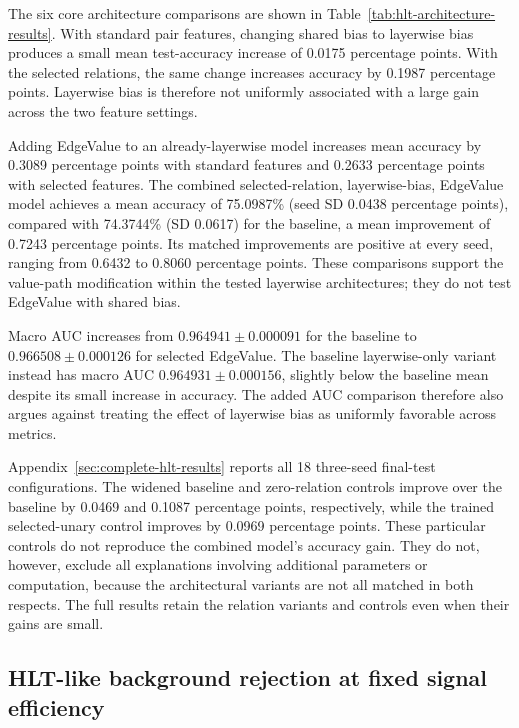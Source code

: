 The six core architecture comparisons are shown in
Table~\ref{tab:hlt-architecture-results}. With standard pair features,
changing shared bias to layerwise bias produces a small mean test-accuracy
increase of 0.0175 percentage points. With the selected relations, the same
change increases accuracy by 0.1987 percentage points. Layerwise bias is
therefore not uniformly associated with a large gain across the two feature
settings.



Adding EdgeValue to an already-layerwise model increases mean accuracy by
0.3089 percentage points with standard features and 0.2633 percentage points
with selected features. The combined selected-relation, layerwise-bias,
EdgeValue model achieves a mean accuracy of 75.0987\% (seed SD 0.0438
percentage points), compared with 74.3744\% (SD 0.0617) for the baseline,
a mean improvement of 0.7243 percentage points. Its matched improvements are
positive at every seed, ranging from 0.6432 to 0.8060 percentage points.
These comparisons support the value-path modification within the tested
layerwise architectures; they do not test EdgeValue with shared bias.

Macro AUC increases from $0.964941\pm0.000091$ for the baseline to
$0.966508\pm0.000126$ for selected EdgeValue. The baseline layerwise-only
variant instead has macro AUC $0.964931\pm0.000156$, slightly below the
baseline mean despite its small increase in accuracy. The added AUC
comparison therefore also argues against treating the effect of layerwise
bias as uniformly favorable across metrics.

Appendix~\ref{sec:complete-hlt-results} reports all 18 three-seed final-test
configurations. The widened baseline and zero-relation controls improve
over the baseline by 0.0469 and 0.1087 percentage points, respectively,
while the trained selected-unary control improves by 0.0969 percentage
points. These particular controls do not reproduce the combined model's
accuracy gain. They do not, however, exclude all explanations involving
additional parameters or computation, because the architectural variants
are not all matched in both respects. The full results retain the relation
variants and controls even when their gains are small.

\subsection{HLT-like background rejection at fixed signal efficiency}
\label{sec:hlt-rejection-results}

